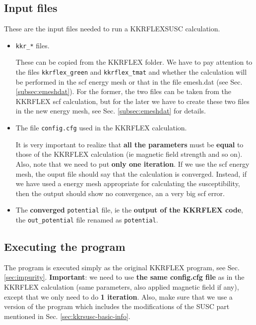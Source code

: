 \documentclass[11pt,fleqn]{book} %
\begin{document}
\subsection{Input files}

These are the input files needed to run a KKRFLEXSUSC calculation.

\begin{itemize}

\item \verb|kkr_*| files.

These can be copied from the KKRFLEX folder.
We have to pay attention to the files
\verb|kkrflex_green| and \verb|kkrflex_tmat|
and whether the calculation
will be performed in the scf energy mesh or that in
the file emesh.dat (see Sec. \ref{subsec:emeshdat}).
For the former, the two files can be taken from the
KKRFLEX scf calculation, but for the later we have to
create these two files in the new energy mesh, see
Sec.  \ref{subsec:emeshdat} for details.

\item The file  \verb|config.cfg| used in the KKRFLEX calculation.

It is very important to realize that \textbf{all the parameters}
must be \textbf{equal} to those of the KKRFLEX calculation
(ie magnetic field strength and so on). Also,
note that we need to put \textbf{only one iteration}.
If we use the scf energy mesh, the ouput file should say
that the calculation is converged. Instead, if we have used
a energy mesh appropriate for calculating the susceptibility, then
the output should show no convergence, an a very big scf error.



\item The \textbf{converged} \verb|potential| file, ie the
\textbf{output of the KKRFLEX code}, the \verb|out_potential| file
renamed as \verb|potential|.



\end{itemize}


\subsection{Executing the program}

The program is executed simply as the original KKRFLEX program,
see Sec. \ref{sec:impurity}.
\textbf{Important}: we need to use \textbf{the same config.cfg file} as
in the KKRFLEX calculation
(same parameters, also applied magnetic field if any),
except that we only need to do \textbf{1 iteration}.
Also, make sure that we use a version of the program which includes the
modifications of the SUSC part mentioned in Sec. \ref{sec:kkrsusc-basic-info}.
\end{document}
